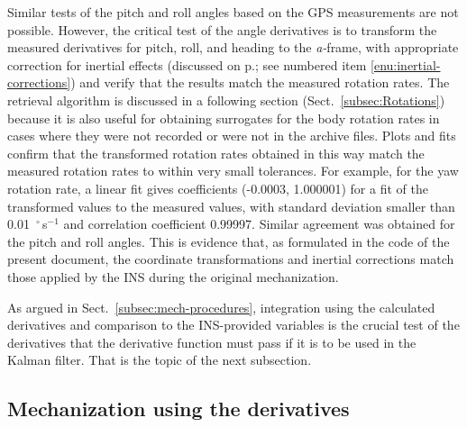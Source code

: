 \documentclass[12pt,twoside,english,12pt,twoside,english]{article}\usepackage[]{graphicx}\usepackage[]{color}
\let\OrgIndex\index
\renewcommand*{\index}[1]{\OrgIndex{#1}}
\begin{document}
Similar tests of the pitch and roll angles based on the GPS measurements
are not possible. However, the critical test of the angle derivatives
is to transform the measured
derivatives
for pitch, roll, and heading to the \emph{a-}frame,
with appropriate correction for inertial effects
(discussed on p.\-\pageref{enu:inertial-corrections}; see numbered
item \ref{enu:inertial-corrections}) and verify that the results
match the measured rotation
rates. The retrieval algorithm is discussed in a following section
(Sect.~\ref{subsec:Rotations}) because it is also useful for obtaining
surrogates for the body rotation rates
in cases where they were not recorded or were not in the archive files.
Plots and fits confirm that the
transformed rotation rates obtained
in this way match the measured rotation
rates to within very small tolerances. For example, for the yaw rotation
rate, a linear fit gives coefficients (-0.0003, 1.000001) for a fit
of the transformed values to the measured values, with standard
deviation smaller than 0.01~$^{\circ}$\,s$^{-1}$ and correlation
coefficient 0.99997. Similar agreement was obtained for the pitch
and roll angles. This is evidence that, as formulated in the code
of the present document, the coordinate
transformations and inertial corrections match those applied by the
INS during the original mechanization. 

As argued in Sect.~\ref{subsec:mech-procedures}, integration
using the calculated derivatives and
comparison to the INS-provided
variables is the crucial test of the derivatives that the derivative
function must pass if it is to be used
in the Kalman filter. That is the topic of the next subsection.



\subsection{Mechanization using the derivatives\label{subsec:Mechanization}}
\end{document}
